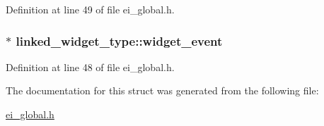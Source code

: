 Definition at line 49 of file ei\_\-global.h.\hypertarget{structlinked__widget__type_ac6368eed48433643c6ce5d2ce9cf6878}{
\subsubsection[{widget\_\-event}]{$\ast$ {\bf linked\_\-widget\_\-type::widget\_\-event}}}
\label{structlinked__widget__type_ac6368eed48433643c6ce5d2ce9cf6878}


Definition at line 48 of file ei\_\-global.h.

The documentation for this struct was generated from the following file:\begin{DoxyCompactItemize}
\item 
\hyperlink{ei__global_8h}{ei\_\-global.h}\end{DoxyCompactItemize}
